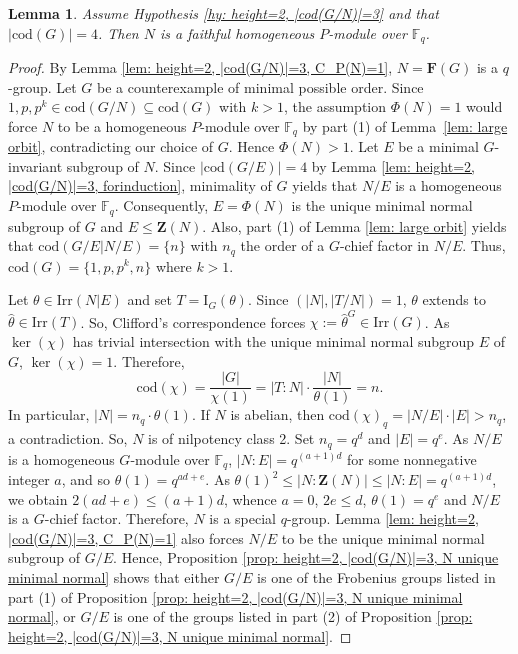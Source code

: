 \documentclass[9pt]{article}
\newtheorem{lem}{\bf Lemma}[section]
\begin{document}
\begin{lem}\label{lem: height=2, |cod(G/N)|=3, N is homogeneous}
   Assume Hypothesis \ref{hy: height=2, |cod(G/N)|=3} and that $|\mathrm{cod}(G)|=4$.
    Then $N$ is a faithful homogeneous $P$-module over $\mathbb{F}_q$.  
\end{lem}
\begin{proof}
	By Lemma \ref{lem: height=2, |cod(G/N)|=3, C_P(N)=1}, $N=\mathbf{F}(G)$ is a $q$-group.
	Let $G$ be a counterexample of minimal possible order.
	Since $1,p,p^{k}\in\mathrm{cod}(G/N)\subseteq\mathrm{cod}(G)$ with $k>1$, the assumption $\Phi(N)=1$ would force $N$ to be a homogeneous $P$-module over $\mathbb{F}_{q}$ by part (1) of Lemma~\ref{lem: large orbit}, contradicting our choice of $G$.  
	Hence $\Phi(N)>1$.
    Let $E$ be a minimal $G$-invariant subgroup of $N$.
	Since $|\mathrm{cod}(G/E)|=4$ by Lemma \ref{lem: height=2, |cod(G/N)|=3, forinduction},
	minimality of $G$ yields that $N/E$ is a homogeneous $P$-module over $\mathbb{F}_{q}$.  
	Consequently, $E=\Phi(N)$ is the unique minimal normal subgroup of $G$ and $E\le\mathbf{Z}(N)$. 
	Also, part (1) of Lemma \ref{lem: large orbit} yields that $\mathrm{cod}(G/E|N/E)=\{ n \}$ with $n_q$ the order of a $G$-chief factor in $N/E$. 
    Thus, $\mathrm{cod}(G)=\{ 1,p,p^{k},n \}$ where $k>1$.
    
	Let $\theta\in \mathrm{Irr}(N|E)$ and set $T=\mathrm{I}_{G}(\theta)$.
	Since $(|N|,|T/N|)=1$, $\theta$ extends to $\hat{\theta}\in \mathrm{Irr}(T)$.
	So, Clifford's correspondence forces $\chi:=\hat{\theta}^{G}\in \mathrm{Irr}(G)$.
	As $\ker(\chi)$ has trivial intersection with the unique minimal normal subgroup $E$ of $G$, $\ker(\chi)=1$.
	 Therefore,
\begin{equation}\label{chi}
		\mathrm{cod}(\chi)=\frac{|G|}{\chi(1)}=|T:N|\cdot \frac{|N|}{\theta(1)}=n.
\end{equation}
    In particular, $|N|=n_q\cdot \theta(1)$.
     If $N$ is abelian, then $\mathrm{cod}(\chi)_q=|N/E|\cdot |E|>n_q$, a contradiction. 
     So, $N$ is of nilpotency class 2.
	 Set $n_q=q^{d}$ and $|E|=q^e$.
	 As $N/E$ is a homogeneous $G$-module over $\mathbb{F}_q$, 
	 $|N:E|=q^{(a+1)d}$ for some nonnegative integer $a$, and so $\theta(1)=q^{ad+e}$.
     As $\theta(1)^{2}\leq |N:\mathbf{Z}(N)|\leq |N:E|=q^{(a+1)d}$,
     we obtain $2(ad+e)\leq (a+1)d$, whence $a=0$, $2e\leq d$, $\theta(1)=q^{e}$ and $N/E$ is a $G$-chief factor.
     Therefore, $N$ is a special $q$-group.
      Lemma \ref{lem: height=2, |cod(G/N)|=3, C_P(N)=1} also
     forces $N/E$ to be the unique minimal normal subgroup of $G/E$.
	 Hence, Proposition \ref{prop: height=2, |cod(G/N)|=3, N unique minimal normal} shows that either $G/E$ is one of the Frobenius groups listed in part (1) of Proposition \ref{prop: height=2, |cod(G/N)|=3, N unique minimal normal},
	 or $G/E$ is one of the groups listed in part (2) of Proposition \ref{prop: height=2, |cod(G/N)|=3, N unique minimal normal}.
     

\end{proof}
\end{document}
